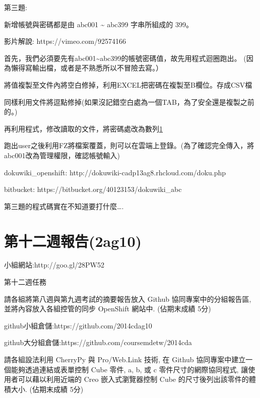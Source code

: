 \documentclass[]{article}
\begin{document}
第三題:

新增帳號與密碼都是由 abc001 \textasciitilde{} abc399 字串所組成的 399。

影片解說: https://vimeo.com/92574166

首先，我們必須要先有abc001\textasciitilde{}abc399的帳號密碼值，故先用程式迴圈跑出。
(因為懶得寫輸出檔，或者是不熟悉所以不冒險去寫。）

將值複製至文件內將空白修掉，利用EXCEL把密碼在複製至B欄位。存成CSV檔

同樣利用文件將逗點修掉(如果沒記錯空白處為一個TAB，為了安全還是複製之前的。)

再利用程式，修改讀取的文件，將密碼處改為數列\href{數列第一資料行位為{[}0{]}，第二資料故為{[}1{]}}{1}

跑出user之後利用FZ將檔案覆蓋，則可以在雲端上登錄。(為了確認完全傳入，將abc001改為管理權限，確認帳號輸入)

dokuwiki\_openshift: http://dokuwiki-cadp13ag8.rhcloud.com/doku.php

bitbucket: https://bitbucket.org/40123153/dokuwiki\_abc

第三題的程式碼實在不知道要打什麼\ldots{}.

\section{第十二週報告(2ag10)}\label{ux7b2cux5341ux4e8cux9031ux5831ux544a2ag10}

小組網站:http://goo.gl/28PW52

第十二週任務

請各組將第八週與第九週考試的摘要報告放入 Github 協同專案中的分組報告區,
並將內容放入各組控管的同步 OpenShift 網站中. (佔期末成績 5分)

github小組倉儲:https://github.com/2014cdag10

github大分組倉儲:https://github.com/coursemdetw/2014cda

請各組設法利用 CherryPy 與 Pro/Web.Link 技術, 在 Github
協同專案中建立一個能夠透過連結或表單控制 Cube 零件, a, b, 或 c
零件尺寸的網際協同程式, 讓使用者可以藉以利用近端的 Creo 嵌入式瀏覽器控制
Cube 的尺寸後列出該零件的體積大小. (佔期末成績 5分)
\end{document}
